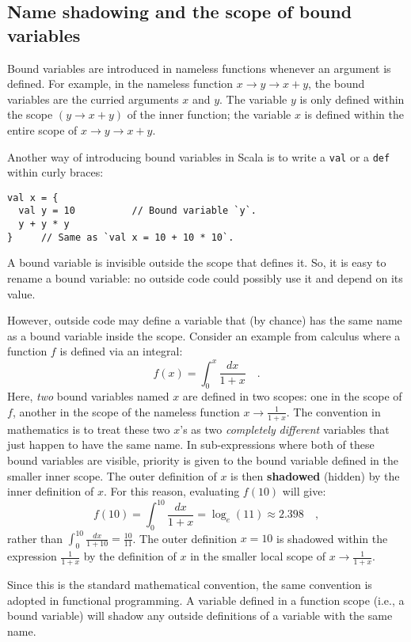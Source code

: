 \subsection{Name shadowing and the scope of bound variables}

Bound variables are introduced in nameless functions whenever an argument
is defined. For example, in the nameless function $x\rightarrow y\rightarrow x+y$,
the bound variables are the curried arguments $x$ and $y$. The variable
$y$ is only defined within the scope $\left(y\rightarrow x+y\right)$
of the inner function; the variable $x$ is defined within the entire
scope of $x\rightarrow y\rightarrow x+y$.

Another way of introducing bound variables in Scala is to write a
\lstinline!val! or a \lstinline!def! within curly braces:
\begin{lstlisting}
val x = {
  val y = 10          // Bound variable `y`.
  y + y * y
}     // Same as `val x = 10 + 10 * 10`.
\end{lstlisting}

A bound variable is invisible outside the scope that defines it. So,
it is easy to rename a bound variable: no outside code could possibly
use it and depend on its value.

However, outside code may define a variable that (by chance) has the
same name as a bound variable inside the scope. Consider an example
from calculus where a function $f$ is defined via an integral:
\[
f(x)=\int_{0}^{x}\frac{dx}{1+x}\quad.
\]
Here, \emph{two} bound variables named $x$ are defined in two scopes:
one in the scope of $f$, another in the scope of the nameless function
$x\rightarrow\frac{1}{1+x}$. The convention in mathematics is to
treat these two $x$\textsf{'}s as two \emph{completely} \emph{different} variables
that just happen to have the same name. In sub-expressions where both
of these bound variables are visible, priority is given to the bound
variable defined in the smaller inner scope. The outer definition
of $x$ is then \textbf{shadowed} (hidden) by
the inner definition of $x$. For this reason, evaluating $f(10)$
will give:
\[
f(10)=\int_{0}^{10}\frac{dx}{1+x}=\log_{e}(11)\approx2.398\quad,
\]
rather than $\int_{0}^{10}\frac{dx}{1+10}=\frac{10}{11}$. The outer
definition $x=10$ is shadowed within the expression $\frac{1}{1+x}$
by the definition of $x$ in the smaller local scope of $x\rightarrow\frac{1}{1+x}$.

Since this is the standard mathematical convention, the same convention
is adopted in functional programming. A variable defined in a function
scope (i.e., a bound variable) will shadow any outside definitions
of a variable with the same name.

